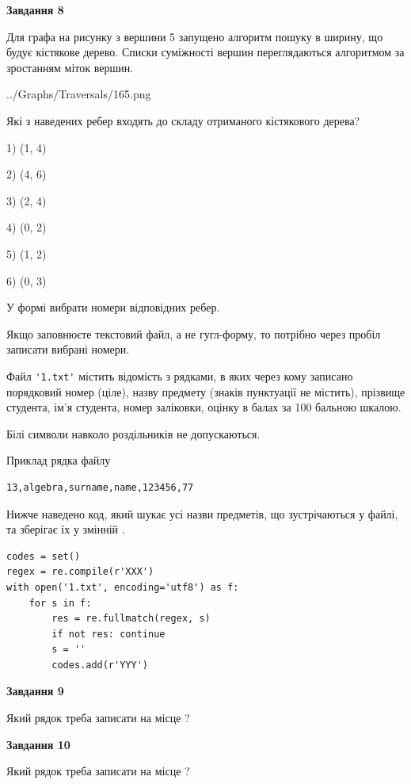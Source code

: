 \documentclass[12pt, ukrainian]{article}
\def\code#1{\Verb!#1!}
\begin{document}
{\begin {large}
{\begin {center}\textbf{Завдання 8}\end {center}}\par
Для графа на рисунку з вершини 5 запущено алгоритм пошуку в ширину, що будує кістякове дерево. Списки суміжності вершин переглядаються алгоритмом за зростанням міток вершин.\par
\begin{center}
	{../Graphs/Traversals/165.png}
\end{center}
\par Які з наведених ребер входять до складу отриманого кістякового дерева?\par
1) (1, 4)\par
2) (4, 6)\par
3) (2, 4)\par
4) (0, 2)\par
5) (1, 2)\par
6) (0, 3)\par
{\vskip 15pt} У формі вибрати номери відповідних ребер.


Якщо заповнюєте текстовий файл, а не гугл-форму, то потрібно через пробіл записа\-ти вибрані номери.\par
\newpage


Файл \code{'1.txt'} містить відомість з рядками, в яких через кому записано поряд\-ковий номер (ціле), назву предмету (знаків пунктуації не містить), прізвище студента, ім'я студента, номер заліковки, оцінку в балах за 100 бальною шкалою.

Білі символи навколо роздільників не допускаються.

Приклад рядка файлу



\begin{verbatim}
13,algebra,surname,name,123456,77
\end{verbatim}


Нижче наведено код, який шукає усі назви предметів, що зустрічаються у файлі, та зберігає їх у змінній .



\begin{verbatim}
codes = set()
regex = re.compile(r'XXX')
with open('1.txt', encoding='utf8') as f:
    for s in f:
        res = re.fullmatch(regex, s)
        if not res: continue
        s = ''
        codes.add(r'YYY')
\end{verbatim}


{\begin {center}\textbf{Завдання 9}\end {center}}\par
Який рядок треба записати на місце  ?\par
\vspace{5mm}


{\begin {center}\textbf{Завдання 10}\end {center}}\par
Який рядок треба записати на місце  ?\par


\newpage


\end {large}}
\end{document}
